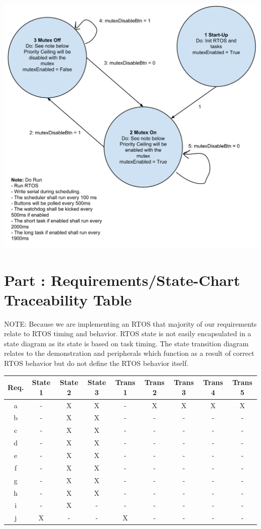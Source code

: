 \documentclass{article}
\newcounter{partNum}
\newcommand{\partNum}{%
        \stepcounter{partNum}%
        \thepartNum}
\newcommand{\sectPart}[1]{\section*{Part \partNum: #1}}
\begin{document}
\begin{center}
    \includegraphics[scale=.5]{RTOS_State_Chart.pdf}
\end{center}

\newpage

\sectPart{Requirements/State-Chart Traceability Table}

NOTE: Because we are implementing an RTOS that majority of our requirements relate to RTOS timing and behavior. RTOS state is not easily encapsulated in a state diagram as its state is based on task timing. The state transition diagram relates to the demonstration and peripherals which function as a result of correct RTOS behavior but do not define the RTOS behavior itself.

\vspace*{1em}

\begin{center}
    \begin{tabular}{| c | c | c | c | c | c | c | c | c |}
        \hline
    Req. & State 1 & State 2 & State 3 & Trans 1 & Trans 2 & Trans 3 & Trans 4 & Trans 5 \\ \hline
    a & - & X & X & - & X & X & X & X \\ \hline
    b & - & X & X & - & - & - & - & - \\ \hline
    c & - & X & X & - & - & - & - & - \\ \hline
    d & - & X & X & - & - & - & - & - \\ \hline
    e & - & X & X & - & - & - & - & - \\ \hline
    f & - & X & X & - & - & - & - & - \\ \hline
    g & - & X & X & - & - & - & - & - \\ \hline
    h & - & X & X & - & - & - & - & - \\ \hline
    i & - & X & - & - & - & - & - & - \\ \hline
    j & X & - & - & X & - & - & - & - \\ \hline
    \end{tabular}
\end{center}
\end{document}
